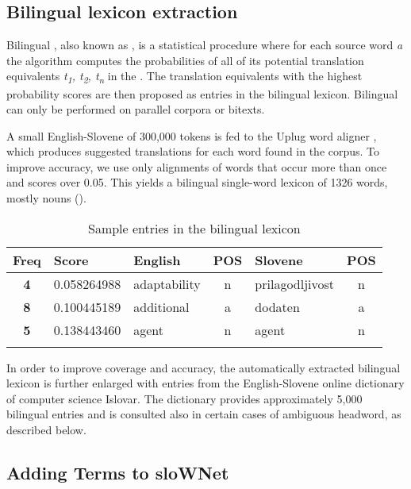 \documentclass[output=paper]{LSP/langsci}
\begin{document}
\subsection{Bilingual lexicon extraction}\label{sec:vintar:4.1}

Bilingual , also known as , is a statistical procedure where for each source word \textit{a} the algorithm computes the probabilities of all of its potential translation equivalents \textit{t}\textit{\textsubscript{1}}\textit{, t}\textit{\textsubscript{2}}\textit{, t}\textit{\textsubscript{n}} in the  \citep{Och2003}. The translation equivalents with the highest probability scores are then proposed as entries in the bilingual lexicon. Bilingual  can only be performed on parallel corpora or bitexts. 

A small English-Slovene  of 300,000 tokens is fed to the Uplug word aligner \citep{Tiedemann2003}, which produces suggested translations for each word found in the corpus. To improve accuracy, we use only alignments of words that occur more than once and  scores over 0.05. This yields a bilingual single-word lexicon of 1326 words, mostly nouns (). 

\begin{table}
\begin{tabular}{cllclc}
\lsptoprule
{\bfseries Freq} & \bfseries Score & \bfseries English & \bfseries POS & \bfseries Slovene & \bfseries POS\\
\midrule
\bfseries 4 & 0.058264988 & adaptability & n & prilagodljivost & n\\
\bfseries 8 & 0.100445189 & additional & a & dodaten & a\\
\bfseries 5 & 0.138443460 & agent & n & agent & n\\
\lspbottomrule
\end{tabular}
\caption{Sample entries in the bilingual lexicon}
\label{tab:vintar:4}
\end{table}

\newpage 
In order to improve coverage and accuracy, the automatically extracted bilingual lexicon is further enlarged with entries from the English-Slovene online dictionary of computer science Islovar. The dictionary provides approximately 5,000 bilingual entries and is consulted also in certain cases of ambiguous headword, as described below.

\subsection{Adding Terms to sloWNet}\label{sec:vintar:4.2}
\end{document}
